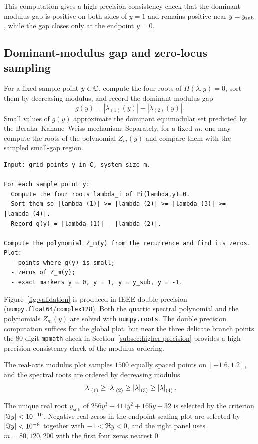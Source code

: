This computation gives a high-precision consistency check that the dominant-modulus gap is positive on both sides of \(y=1\) and remains positive near \(y=y_{\mathrm{sub}}\), while the gap closes only at the endpoint \(y=0\).

\subsection{Dominant-modulus gap and zero-locus sampling}

For a fixed sample point \(y\in\mathbb{C}\), compute the four roots of \(\Pi(\lambda,y)=0\),
sort them by decreasing modulus,
and record the dominant-modulus gap
\[
g(y)=|\lambda_{(1)}(y)|-|\lambda_{(2)}(y)|.
\]
Small values of \(g(y)\) approximate the dominant equimodular set predicted by the Beraha--Kahane--Weiss mechanism.
Separately, for a fixed \(m\), one may compute the roots of the polynomial \(Z_m(y)\) and compare them with the sampled small-gap region.

\begin{verbatim}
Input: grid points y in C, system size m.

For each sample point y:
  Compute the four roots lambda_i of Pi(lambda,y)=0.
  Sort them so |lambda_(1)| >= |lambda_(2)| >= |lambda_(3)| >= |lambda_(4)|.
  Record g(y) = |lambda_(1)| - |lambda_(2)|.

Compute the polynomial Z_m(y) from the recurrence and find its zeros.
Plot:
  - points where g(y) is small;
  - zeros of Z_m(y);
  - exact markers y = 0, y = 1, y = y_sub, y = -1.
\end{verbatim}

Figure~\ref{fig:validation} is produced in IEEE double precision (\texttt{numpy.float64}/\texttt{complex128}).
Both the quartic spectral polynomial and the polynomials \(Z_m(y)\) are solved with \texttt{numpy.roots}.
The double precision computation suffices for the global plot, but near the three delicate branch points the \(80\)-digit \texttt{mpmath} check in Section~\ref{subsec:higher-precision} provides a high-precision consistency check of the modulus ordering.

The real-axis modulus plot samples \(1500\) equally spaced points on \([-1.6,1.2]\), and the spectral roots are ordered by decreasing modulus
\[
\left\lvert \lambda\right\rvert_{(1)}\ge \left\lvert \lambda\right\rvert_{(2)}\ge \left\lvert \lambda\right\rvert_{(3)}\ge \left\lvert \lambda\right\rvert_{(4)}.
\]

The unique real root \(y_{\mathrm{sub}}\) of \(256y^3+411y^2+165y+32\) is selected by the criterion \(\left\lvert \Im y\right\rvert<10^{-10}\).
Negative real zeros in the endpoint-scaling plot are selected by \(\left\lvert \Im y\right\rvert<10^{-8}\) together with \(-1<\Re y<0\), and the right panel uses \(m=80,120,200\) with the first four zeros nearest \(0\).
